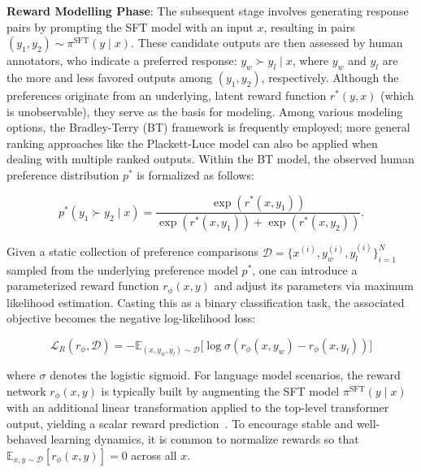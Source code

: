 \textbf{Reward Modelling Phase}: The subsequent stage involves generating response pairs by prompting the SFT model with an input $x$, resulting in pairs $(y_1, y_2)\sim \pi^\text{SFT}(y \mid x)$. These candidate outputs are then assessed by human annotators, who indicate a preferred response: $y_w\succ y_l \mid x$, where $y_w$ and $y_l$ are the more and less favored outputs among $(y_1, y_2)$, respectively. Although the preferences originate from an underlying, latent reward function $r^*(y, x)$ (which is unobservable), they serve as the basis for modeling. Among various modeling options, the Bradley-Terry (BT) framework \cite{bradley1952rankanalysis} is frequently employed; more general ranking approaches like the Plackett-Luce model \citep{plackett1975analysis, luce2012individual} can also be applied when dealing with multiple ranked outputs. Within the BT model, the observed human preference distribution $p^*$ is formalized as follows:

\begin{equation}\label{eq:bradley-terry}
    p^*(y_1\succ y_2 \mid x)=\frac{\exp\left(r^*(x, y_1)\right)}{\exp\left(r^*(x, y_1)\right) + \exp\left(r^*(x, y_2)\right)}.
\end{equation}

Given a static collection of preference comparisons $\mathcal{D}=\bigl\{x^{(i)}, y_w^{(i)}, y_l^{(i)}\bigr\}_{i=1}^N$ sampled from the underlying preference model $p^*$, one can introduce a parameterized reward function $r_{\phi}(x, y)$ and adjust its parameters via maximum likelihood estimation. Casting this as a binary classification task, the associated objective becomes the negative log-likelihood loss:

\begin{equation}\label{eq:reward_model}
    \mathcal{L}_R(r_{\phi}, \mathcal{D}) = -\mathbb{E}_{(x, y_w, y_l)\sim \mathcal{D}}\bigl[\log \sigma(r_{\phi}(x, y_w)- r_{\phi}(x, y_l))\bigr]
\end{equation}

where $\sigma$ denotes the logistic sigmoid. For language model scenarios, the reward network $r_{\phi}(x, y)$ is typically built by augmenting the SFT model $\pi^\text{SFT}(y \mid x)$ with an additional linear transformation applied to the top-level transformer output, yielding a scalar reward prediction~\cite{ziegler2020finetuning}. To encourage stable and well-behaved learning dynamics, it is common to normalize rewards so that  $\mathbb{E}_{x,y\sim \mathcal{D}}\left[r_\phi(x, y)\right] = 0$ across all $x$.

